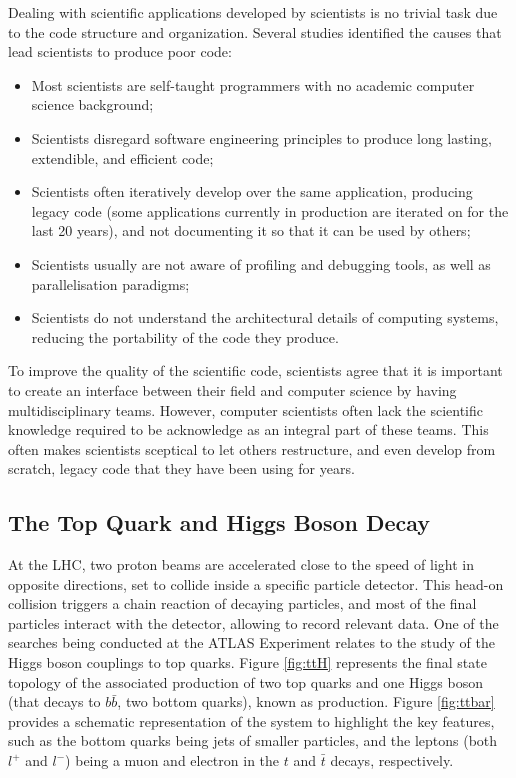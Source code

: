 Dealing with scientific applications developed by scientists is no trivial task due to the code structure and organization. Several studies \cite{SC:Nature,SC:Develop,SC:SC11,SC:28280} identified the causes that lead scientists to produce poor code:

\begin{center}
	\begin{itemize}
		\item Most scientists are self-taught programmers with no academic computer science background;
		\item Scientists disregard software engineering principles to produce long lasting, extendible, and efficient code;
		\item Scientists often iteratively develop over the same application, producing legacy code (some applications currently in production are iterated on for the last 20 years), and not documenting it so that it can be used by others;
		\item Scientists usually are not aware of profiling and debugging tools, as well as parallelisation paradigms;
		\item Scientists do not understand the architectural details of computing systems, reducing the portability of the code they produce.
	\end{itemize}
\end{center}

To improve the quality of the scientific code, scientists agree that it is important to create an interface between their field and computer science by having multidisciplinary teams. However, computer scientists often lack the scientific knowledge required to be acknowledge as an integral part of these teams. This often makes scientists sceptical to let others restructure, and even develop from scratch, legacy code that they have been using for years.

\subsection{The Top Quark and Higgs Boson Decay}
\label{ttH}

At the LHC, two proton beams are accelerated close to the speed of light in opposite directions, set to collide inside a specific particle detector. This head-on collision triggers a chain reaction of decaying particles, and most of the final particles interact with the detector, allowing to record relevant data. One of the searches being conducted at the ATLAS Experiment relates to the study of the Higgs boson couplings to top quarks. Figure \ref{fig:ttH} represents the final state topology of the associated production of two top quarks and one Higgs boson (that decays to $b\bar{b}$, two bottom quarks), known as \ttH production. Figure \ref{fig:ttbar} provides a schematic representation of the system to highlight the key features, such as the bottom quarks being jets of smaller particles, and the leptons (both $l^+$ and $l^-$) being a muon and electron in the $t$ and $\bar{t}$ decays, respectively.

